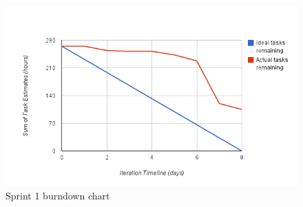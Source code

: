 \begin{figure}
	\begin{center}
		\includegraphics[width=15cm]{Pictures/Charts/Sprint1burndown}
	\end{center}
	\caption{Sprint 1 burndown chart}
	\label{fig:sprint1burndown}
\end{figure}

